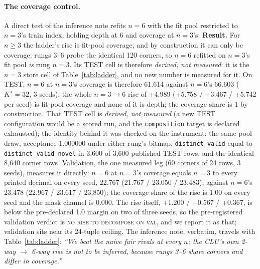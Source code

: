 \documentclass{article} %
\newcommand{\Kstar}{\ensuremath{K^{\star}}}
\begin{document}
\paragraph{The coverage control.} A direct test of the inference note refits $n=6$ with the
fit pool restricted to $n=3$'s train index, holding depth at 6 and coverage at $n=3$'s.
\textbf{Result.} For $n\ge3$ the ladder's rise is fit-pool
coverage, and by construction it can only be coverage: rungs 3--6 probe the identical 120 corners, %
so $n=6$ refitted on $n=3$'s fit pool \emph{is} rung $n=3$. Its TEST cell is therefore
\emph{derived, not measured}: it is the $n=3$ store cell of Table~\ref{tab:ladder}, and no new
number is measured for it. %
On TEST, $n=6$ at $n=3$'s coverage is therefore 61.614 against $n=6$'s 66.603 ($\Kstar=32$, 3 seeds): %
the whole $n=3\to6$ rise of +4.989 (+5.758 / +3.467 / +5.742 per seed) is fit-pool coverage and %
none of it is depth; the coverage share is 1 by construction. That TEST cell is \emph{derived, not
measured} (a new TEST configuration would be a scored run, and the \texttt{composition} target is
declared exhausted); the identity behind it was checked on the instrument: the same pool draw,
acceptance 1.000000 under either rung's bitmap, \texttt{distinct\_valid} equal to %
\texttt{distinct\_valid\_novel} in 3,600 of 3,600 published TEST rows, and the identical 8,640 %
corner rows. Validation, the one measured leg (60 corners of 24 rows, 3 seeds), measures it %
directly: $n=6$ at $n=3$'s coverage equals $n=3$ to every printed decimal on every seed, 22.767 %
(21.767 / 23.050 / 23.483), against $n=6$'s 23.478 (22.967 / 23.617 / 23.850); the coverage %
share of the rise is 1.00 on every seed and the mask channel is 0.000. The rise itself, %
+1.200 / +0.567 / +0.367, is below the pre-declared 1.0 margin on two of three seeds, so the %
pre-registered validation verdict is \textsc{no rise to decompose on val}, and we report it as
that; validation sits near its 24-tuple ceiling. The inference note, verbatim, travels with %
Table~\ref{tab:ladder}: \emph{``We beat the naive fair rivals at every $n$; the CLU's own 2-way
$\to$ 6-way rise is not to be inferred, because rungs 3--6 share corners and differ in coverage.''}
\end{document}
